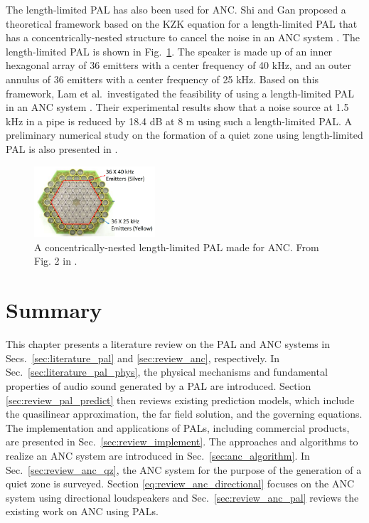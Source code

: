 The length-limited PAL has also been used for ANC.
Shi and Gan proposed a theoretical framework based on the KZK equation for a length-limited PAL that has a concentrically-nested structure to cancel the noise in an ANC system \cite{Shi2013UsingLengthlimitedParametric}.
The length-limited PAL is shown in Fig.~\ref{fig:length_limited_PAL_Lam2014}.
The speaker is made up of an inner hexagonal array of 36 emitters with {a} center frequency of 40 kHz, and an outer annulus of 36 emitters with {a} center frequency of 25 kHz.
Based on this framework, Lam et al.\ investigated the feasibility of using a length-limited PAL in an ANC system \cite{Lam2014FeasibilityLengthlimitedParametric}.
Their experimental results show that a noise source at 1.5 kHz in a pipe is reduced by 18.4 dB at 8 m using such a length-limited PAL.
A preliminary numerical study on the formation of a quiet zone using length-limited PAL is also presented in \cite{Wang2019FormationLocalQuiet}. 

\begin{figure}[htb]
    \centering
    \includegraphics[width = 0.4\textwidth]{fig/length_limited_PAL_Lam2014_resize.png}
    \caption{A concentrically-nested length-limited PAL made for ANC. From Fig. 2 in \cite{Lam2014FeasibilityLengthlimitedParametric}.}
    \label{fig:length_limited_PAL_Lam2014}
\end{figure}



\section{Summary}
This chapter presents a literature review on the PAL and ANC systems in Secs.~\ref{sec:literature_pal} and \ref{sec:review_anc}, respectively.
In Sec.~\ref{sec:literature_pal_phys}, the physical mechanisms and fundamental properties of audio sound generated by a PAL are introduced. 
Section \ref{sec:review_pal_predict} {then} reviews existing prediction models, which include the quasilinear approximation, the far field solution, and the governing equations.
The implementation and applications of PALs, including commercial products, are presented in Sec.~\ref{sec:review_implement}.
The approaches and algorithms to realize an ANC system are introduced in Sec.~\ref{sec:anc_algorithm}.
In Sec.~\ref{sec:review_anc_qz}, the ANC system for the purpose of the generation of a quiet zone is surveyed. 
Section \ref{eq:review_anc_directional} focuses on the ANC system using directional loudspeakers and Sec.~\ref{sec:review_anc_pal} reviews the existing work on ANC using PALs.

